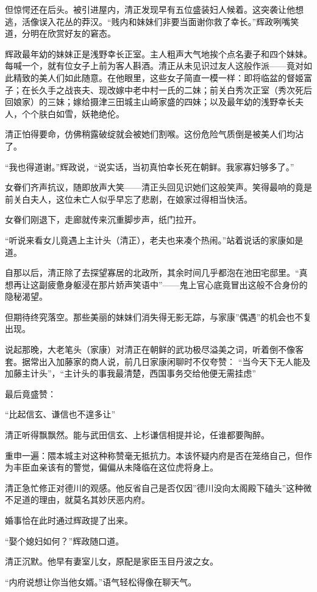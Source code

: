 \documentclass[
]{book}
\begin{document}
但惊愕还在后头。被引进屋内，清正发现早有五位盛装妇人候着。这突袭让他想逃，活像误入花丛的莽汉。``贱内和妹妹们非要当面谢你救了幸长。''辉政咧嘴笑道，分明在欣赏好友的窘态。

辉政最年幼的妹妹正是浅野幸长正室。主人粗声大气地挨个点名妻子和四个妹妹。每喊一个，就有位女子上前为客人斟酒。清正从未见识过友人这般作派------竟对如此精致的美人们如此随意。在他眼里，这些女子简直一模一样：即将临盆的督姬富子；在长久手之战丧夫、现改嫁中老中村一氏的二妹；前关白秀次正室（秀次死后回娘家）的三妹；嫁给摄津三田城主山崎家盛的四妹；以及最年幼的浅野幸长夫人，个个肤白如雪，妖艳绝伦。

清正怕得要命，仿佛稍露破绽就会被她们割喉。这份危险气质倒是被美人们均沾了。

``我也得道谢。''辉政说，``说实话，当初真怕幸长死在朝鲜。我家寡妇够多了。''

女眷们齐声抗议，随即放声大笑------清正头回见识她们这般笑声。笑得最响的竟是前关白夫人，这位未亡人似乎早忘了悲剧，在娘家过得相当快活。

女眷们刚退下，走廊就传来沉重脚步声，纸门拉开。

``听说来看女儿竟遇上主计头（清正），老夫也来凑个热闹。''站着说话的家康如是道。

自那以后，清正除了去探望寡居的北政所，其余时间几乎都泡在池田宅邸里。``真想再让这副疲惫身躯浸在那片娇声笑语中''------鬼上官心底竟冒出这般不合身份的隐秘渴望。

但期待终究落空。那些美丽的妹妹们消失得无影无踪，与家康''偶遇''的机会也不复出现。

说起那晚，大老笔头（家康）对清正在朝鲜的武功极尽溢美之词，听着倒不像客套。据常出入加藤家的商人说，前几日家康闲聊时不仅夸赞： ``当今天下无人能及加藤主计头''，``主计头的事我最清楚，西国事务交给他便无需挂虑''

最后竟盛赞：

``比起信玄、谦信也不遑多让''

清正听得飘飘然。能与武田信玄、上杉谦信相提并论，任谁都要陶醉。

重申一遍：隈本城主对这种称赞毫无抵抗力。本该怀疑内府是否在笼络自己，但作为丰臣血亲该有的警觉，偏偏从未降临在这位虎将身上。

清正急忙修正对德川的观感。他反省自己是否仅因''德川没向太阁殿下磕头''这种微不足道的理由，就莫名其妙厌恶内府。

婚事恰在此时通过辉政提了出来。

``娶个媳妇如何？''辉政随口道。

清正沉默。他早有妻室儿女，原配是家臣玉目丹波之女。

``内府说想让你当他女婿。''语气轻松得像在聊天气。
\end{document}
